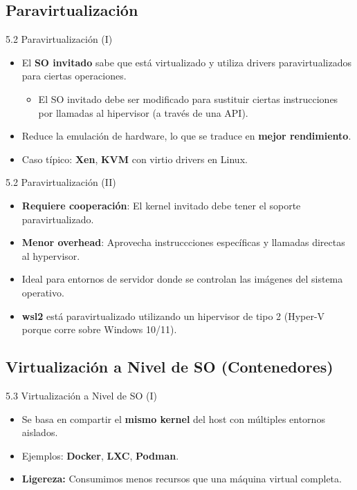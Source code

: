\documentclass{beamer}
\begin{document}
\subsection{Paravirtualización}
\begin{frame}{5.2 Paravirtualización (I)}
    \begin{itemize}
        \item El \textbf{SO invitado} sabe que está virtualizado y utiliza drivers paravirtualizados para ciertas operaciones. 
        \begin{itemize}
            \item El SO invitado debe ser modificado para sustituir ciertas instrucciones por llamadas al hipervisor (a través de una API).        
        \end{itemize}
        \item Reduce la emulación de hardware, lo que se traduce en \textbf{mejor rendimiento}.
        \item Caso típico: \textbf{Xen}, \textbf{KVM} con virtio drivers en Linux.
    \end{itemize}
\end{frame}

\begin{frame}{5.2 Paravirtualización (II)}
    \begin{itemize}
        \item \textbf{Requiere cooperación}: El kernel invitado debe tener el soporte paravirtualizado.
        \item \textbf{Menor overhead}: Aprovecha instruccciones específicas y llamadas directas al hypervisor.
        \item Ideal para entornos de servidor donde se controlan las imágenes del sistema operativo.
        \item \textbf{wsl2} está paravirtualizado utilizando un hipervisor de tipo 2 (Hyper-V porque corre sobre Windows 10/11).
        \end{itemize}
\end{frame}

\subsection{Virtualización a Nivel de SO (Contenedores)}
\begin{frame}{5.3 Virtualización a Nivel de SO (I)}
    \begin{itemize}
        \item Se basa en compartir el \textbf{mismo kernel} del host con múltiples entornos aislados.
        \item Ejemplos: \textbf{Docker}, \textbf{LXC}, \textbf{Podman}.
        \item \textbf{Ligereza:} Consumimos menos recursos que una máquina virtual completa.
    \end{itemize}
\end{frame}
\end{document}
